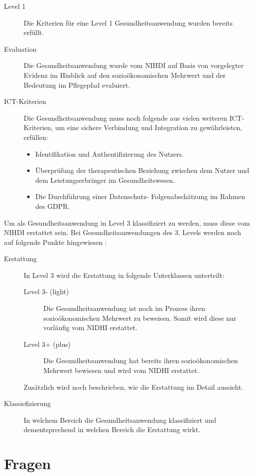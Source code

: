 \documentclass{article}
\begin{document}
			\begin{description}
				\item[Level 1] Die Kriterien für eine Level 1 Gesundheitsanwendung wurden bereits erfüllt.
				\item[Evaluation] Die Gesundheitsanwendung wurde vom NIHDI auf Basis von vorgelegter Evidenz im Hinblick auf den sozioökonomischen Mehrwert und der Bedeutung im Pflegepfad evaluiert. 
				\item[ICT-Kriterien] Die Gesundheitsanwendung muss noch folgende aus vielen weiteren ICT-Kriterien, um eine sichere Verbindung und Integration zu gewährleisten, erfüllen:
					\begin{itemize}
						\item Identifikation und Authentifizierung des Nutzers.
						\item Überprüfung der therapeutischen Beziehung zwischen dem Nutzer und dem Leistungserbringer im Gesundheitswesen.
						\item Die Durchführung einer Datenschutz- Folgenabschätzung im Rahmen des GDPR.
					\end{itemize}
			\end{description}
			Um als Gesundheitsanwendung in Level 3 klassifiziert zu werden, muss diese vom NIHDI erstattet sein. Bei Gesundheitsanwendungen des 3. Levels werden noch auf folgende Punkte hingewiesen \cite[vgl. What do we consider as mhealth or mobile medical application?]{belgien-pyramide}:
			\begin{description}
				\item[Erstattung] In Level 3 wird die Erstattung in folgende Unterklassen unterteilt:
					\begin{description}
						\item[Level 3- (light)] Die Gesundheitsanwendung ist noch im Prozess ihren sozioökonomischen Mehrwert zu beweisen. Somit wird diese nur vorläufig vom NIDHI erstattet.
						\item[Level 3+ (plus)] Die Gesundheitsanwendung hat bereits ihren sozioökonomischen Mehrwert bewiesen und wird vom NIDHI erstattet.
					\end{description}
				Zusätzlich wird noch beschrieben, wie die Erstattung im Detail aussieht.
				\item[Klassiefizierung] In welchem Bereich die Gesundheitsanwendung klassifiziert und dementsprechend in welchen Bereich die Erstattung wirkt. 
			\end{description} 
			
			\newpage		
	\section{Fragen}
\end{document}
